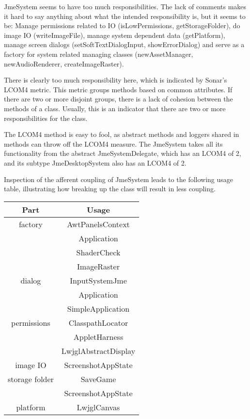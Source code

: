 \documentclass[a4paper, 10pt]{article}
\begin{document}
JmeSystem seems to have too much responsibilities.
The lack of comments makes it hard to say anything about what 
the intended responsibility is, but it seems to be:
Manage permissions related to IO 
(isLowPermissions, getStorageFolder),
do image IO (writeImageFile),
manage system dependent data (getPlatform),
manage screen dialogs 
(setSoftTextDialogInput, showErrorDialog) and
serve as a factory for system related managing classes 
(newAssetManager, newAudioRenderer, createImageRaster).

There is clearly too much responsibility here, 
which is indicated by Sonar's LCOM4 metric.
This metric groups methods based on common attributes.
If there are two or more disjoint groups, 
there is a lack of cohesion between the methods of a class.
Usually, this is an indicator that there are two or more 
responsibilities for the class.

The LCOM4 method is easy to fool, as
abstract methods and loggers shared in methods can throw off
the LCOM4 measure.
The JmeSystem takes all its functionality 
from the abstract JmeSystemDelegate, 
which has an LCOM4 of 2,
and its subtype JmeDesktopSystem also has an LCOM4 of 2.

Inspection of the afferent coupling of JmeSystem 
leads to the following usage table, 
illustrating how breaking up the class will result in 
less coupling.

\begin{tabular}{|c|c|}
\hline
\textbf{Part}&\textbf{Usage}\\\hline
factory	& AwtPanelsContext\\\hline
		& Application\\\hline
		& ShaderCheck\\\hline
		& ImageRaster\\\hline
dialog	& InputSystemJme\\\hline
		& Application\\\hline
		& SimpleApplication\\\hline
permissions	& ClasspathLocator\\\hline
			& AppletHarness\\\hline
			& LwjglAbstractDisplay\\\hline
image IO	& ScreenshotAppState\\\hline
storage folder	& SaveGame\\\hline
				& ScreenshotAppState\\\hline
platform	& LwjglCanvas\\\hline
\end{tabular}
\end{document}
